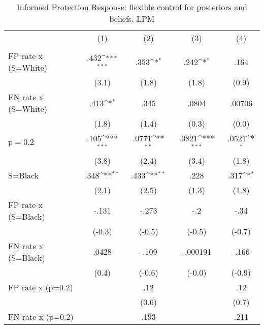 \begin{table}[htbp]\centering
\def\sym#1{\ifmmode^{#1}\else\(^{#1}\)\fi}
\caption{Informed Protection Response: flexible control for posteriors and beliefs, LPM}
\begin{tabular}{l*{4}{c}}
\hline\hline
                &\multicolumn{1}{c}{(1)}&\multicolumn{1}{c}{(2)}&\multicolumn{1}{c}{(3)}&\multicolumn{1}{c}{(4)}\\
                &\multicolumn{1}{c}{}&\multicolumn{1}{c}{}&\multicolumn{1}{c}{}&\multicolumn{1}{c}{}\\
\hline
FP rate x (S=White)&     .432\sym{***}&     .353\sym{*}  &     .242\sym{*}  &     .164         \\
                &    (3.1)         &    (1.8)         &    (1.8)         &    (0.9)         \\
FN rate x (S=White)&     .413\sym{*}  &     .345         &    .0804         &   .00706         \\
                &    (1.8)         &    (1.4)         &    (0.3)         &    (0.0)         \\
p$=$0.2         &     .105\sym{***}&    .0771\sym{**} &    .0821\sym{***}&    .0521\sym{*}  \\
                &    (3.8)         &    (2.4)         &    (3.4)         &    (1.8)         \\
S=Black         &     .348\sym{**} &     .433\sym{**} &     .228         &     .317\sym{*}  \\
                &    (2.1)         &    (2.5)         &    (1.3)         &    (1.8)         \\
FP rate x (S=Black)&    -.131         &    -.273         &      -.2         &     -.34         \\
                &   (-0.3)         &   (-0.5)         &   (-0.5)         &   (-0.7)         \\
FN rate x (S=Black)&    .0428         &    -.109         & -.000191         &    -.166         \\
                &    (0.4)         &   (-0.6)         &   (-0.0)         &   (-0.9)         \\
FP rate x (p=0.2)&                  &      .12         &                  &      .12         \\
                &                  &    (0.6)         &                  &    (0.7)         \\
FN rate x (p=0.2)&                  &     .193         &                  &     .211         \\

\end{tabular}
\end{table}
